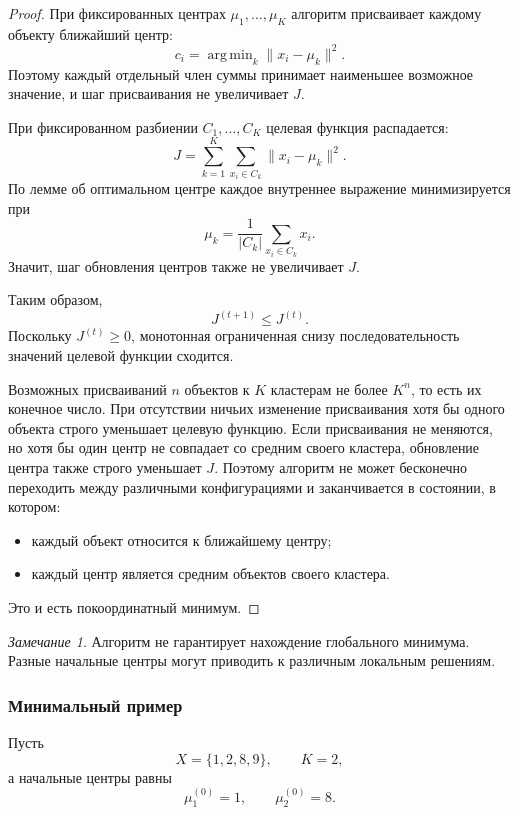 \documentclass[12pt,a4paper]{article}
\theoremstyle{definition}
\theoremstyle{remark}
\newtheorem{remark}[theorem]{Замечание}
\DeclareMathOperator*{\argmin}{arg\,min}
\begin{document}
\begin{proof}
При фиксированных центрах $\mu_1,\ldots,\mu_K$ алгоритм присваивает
каждому объекту ближайший центр:
\[
    c_i
    =
    \argmin_k\|x_i-\mu_k\|^2.
\]
Поэтому каждый отдельный член суммы принимает наименьшее возможное
значение, и шаг присваивания не увеличивает $J$.

При фиксированном разбиении $C_1,\ldots,C_K$ целевая функция распадается:
\[
    J
    =
    \sum_{k=1}^{K}
    \sum_{x_i\in C_k}
    \|x_i-\mu_k\|^2.
\]
По лемме об оптимальном центре каждое внутреннее выражение минимизируется
при
\[
    \mu_k
    =
    \frac{1}{|C_k|}
    \sum_{x_i\in C_k}x_i.
\]
Значит, шаг обновления центров также не увеличивает $J$.

Таким образом,
\[
    J^{(t+1)}\leq J^{(t)}.
\]
Поскольку $J^{(t)}\geq 0$, монотонная ограниченная снизу последовательность
значений целевой функции сходится.

Возможных присваиваний $n$ объектов к $K$ кластерам не более $K^n$, то есть
их конечное число. При отсутствии ничьих изменение присваивания хотя бы
одного объекта строго уменьшает целевую функцию. Если присваивания не
меняются, но хотя бы один центр не совпадает со средним своего кластера,
обновление центра также строго уменьшает $J$. Поэтому алгоритм не может
бесконечно переходить между различными конфигурациями и заканчивается в
состоянии, в котором:

\begin{itemize}
    \item каждый объект относится к ближайшему центру;
    \item каждый центр является средним объектов своего кластера.
\end{itemize}

Это и есть покоординатный минимум.
\end{proof}

\begin{remark}
Алгоритм не гарантирует нахождение глобального минимума. Разные начальные
центры могут приводить к различным локальным решениям.
\end{remark}

\subsubsection{Минимальный пример}

Пусть
\[
    X=\{1,2,8,9\},
    \qquad K=2,
\]
а начальные центры равны
\[
    \mu_1^{(0)}=1,
    \qquad
    \mu_2^{(0)}=8.
\]
\end{document}
